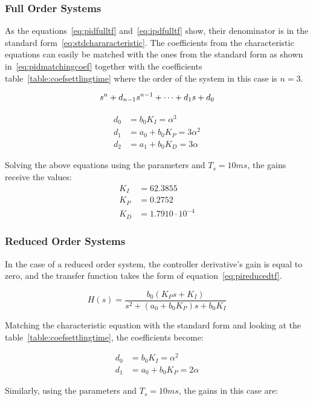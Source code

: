 \subsubsection{Full Order Systems}

As the equations~\ref{eq:pidfulltf} and~\ref{eq:ipdfulltf} show, their denominator is in the standard form~\ref{eq:stdchararacteristic}. The coefficients from the characteristic equations can easily be matched with the ones from the standard form as shown in~\ref{eq:pidmatchingcoef} together with the coefficients table~\ref{table:coefsettlingtime} where the order of the system in this case is $n=3$.


\begin{equation}
\centering
\label{eq:stdchararacteristic}
s^n + d_{n-1}s^{n-1} + \cdots + d_1 s + d_0 
\end{equation}

\begin{align}
\label{eq:pidmatchingcoef}
d_0 &= b_0 K_I = \alpha^3
\\
d_1 &= a_0 + b_0 K_P = 3\alpha^2
\\
d_2 &= a_1 + b_0 K_D = 3\alpha
\end{align}

Solving the above equations using the parameters and $T_s=10ms$, the gains receive the values:
\begin{align*}
\label{eq:gainsvaluesfull}
K_I &= 62.3855
\\
K_P &= 0.2752
\\
K_D &= 1.7910\cdot10^{-4}
\end{align*}


\subsubsection{Reduced Order Systems}

In the case of a reduced order system, the controller derivative's gain is equal to zero, and the transfer function takes the form of equation~\ref{eq:pireducedtf}.

\begin{equation}
\label{eq:pireducedtf}
H(s) = \dfrac{b_0(K_Ps + K_I)}{s^2 + (a_0 + b_0 K_P)s + b_0 K_I }
\end{equation}

Matching the characteristic equation with the standard form and looking at the table~\ref{table:coefsettlingtime}, the coefficients become:

\begin{align*}
\label{eq:pimatchingcoef}
d_0 &= b_0 K_I = \alpha^2
\\
d_1 &= a_0 + b_0 K_P = 2\alpha
\end{align*}

Similarly, using the parameters and $T_s=10ms$, the gains in this case are:


